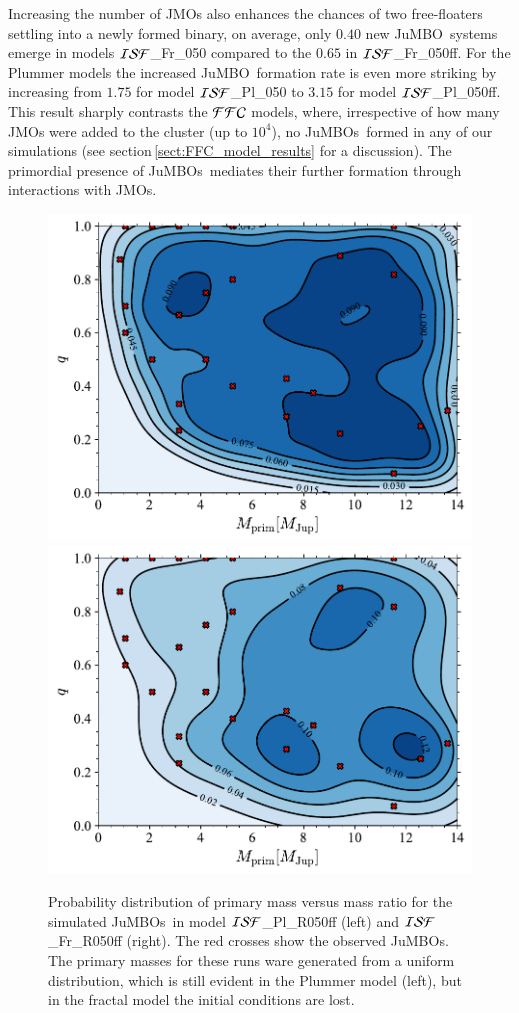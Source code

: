 \documentclass[submission,phys]{lib/SciPost}
\newcommand{\jumbo}{\mbox{JuMBO}}
\newcommand{\jumbos}{\mbox{JuMBOs}}
\begin{document}
Increasing the number of JMOs also enhances the chances of two
free-floaters settling into a newly formed binary, on average, only
$0.40$ new \jumbo\, systems emerge in models ${\cal ISF}$\_Fr\_050 compared to the
$0.65$ in ${\cal ISF}$\_Fr\_050ff. For the Plummer models the increased \jumbo\,
formation rate is even more striking by increasing from $1.75$ for
model ${\cal ISF}$\_Pl\_050 to $3.15$ for model ${\cal ISF}$\_Pl\_050ff.  This result sharply
contrasts the ${\cal FFC}$ models, where, irrespective of how many
JMOs were added to the cluster (up to $10^4$), no \jumbos\, formed in any
of our simulations (see section\,\ref{sect:FFC_model_results} for a
discussion). The primordial presence of \jumbos\, mediates their
further formation through interactions with JMOs.


\begin{figure}
    \centering
    \includegraphics[width=0.49\columnwidth]{figures/Plummer_rvir0.5_FF_mass_distr.pdf}
    \includegraphics[width=0.49\columnwidth]{figures/Fractal_rvir0.5_FF_mass_distr.pdf}
    \caption{Probability distribution of primary mass versus mass
      ratio for the simulated \jumbos\, in model ${\cal
        ISF}$\_Pl\_R050ff (left) and ${\cal
        ISF}$\_Fr\_R050ff (right).  The red crosses show the
      observed \jumbos.  The primary masses for these runs ware
      generated from a uniform distribution, which is still evident in
      the Plummer model (left), but in the fractal model the initial
      conditions are lost.  }
         \label{Fig:Gen_mdistr_Plummer}
         \label{Fig:Gen_mdistr_Fractal}
\end{figure}
\end{document}
